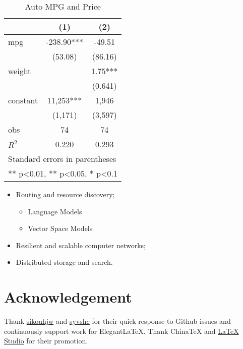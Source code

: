 \documentclass[en,hazy,screen,blue,14pt]{elegantnote}
\begin{document}
\begin{table}[htbp]
  \small
  \centering
  \caption{Auto MPG and Price \label{tab:reg}}
    \begin{tabular}{lcc}
    \toprule
                    &       (1)         &        (2)      \\
    \midrule
    mpg             &    -238.90***     &      -49.51     \\
                    &     (53.08)       &      (86.16)    \\
    weight          &                   &      1.75***    \\
                    &                   &      (0.641)    \\
    constant        &     11,253***     &       1,946     \\
                    &     (1,171)       &      (3,597)   \\
    obs             &        74         &         74     \\
    $R^2$           &      0.220        &       0.293    \\
    \bottomrule
    \multicolumn{3}{l}{\scriptsize Standard errors in parentheses} \\
    \multicolumn{3}{l}{\scriptsize *** p<0.01, ** p<0.05, * p<0.1} \\
    \end{tabular}%
\end{table}%


\begin{itemize}[noitemsep]
  \item Routing and resource discovery;
    \begin{itemize} 
      \item Language Models
      \item Vector Space Models
    \end{itemize}
  \item Resilient and scalable computer networks;
  \item Distributed storage and search.
\end{itemize}


\section{Acknowledgement}

Thank \href{https://github.com/sikouhjw}{sikouhjw} and \href{https://github.com/syvshc}{syvshc} for their quick response to Github issues and continuously support work for ElegantLaTeX. Thank ChinaTeX and \href{http://www.latexstudio.net/}{LaTeX Studio} for their promotion. 
\end{document}
